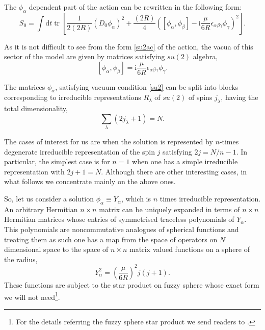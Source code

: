\documentclass[a4paper]{article}
\newcommand{\ii}{\mathrm{i}}
\newcommand{\dd}{\mathrm{d}}
\newcommand{\tr}{\mathop{\mathrm{tr}}\nolimits}
\begin{document}
The $\phi_\alpha$ dependent part of the action can be rewritten in
the following form:
\begin{equation}\label{su2ac}
S_0=\int\dd t\tr\left[\frac{1}{2(2R)}(D_0\phi_\alpha)^2+
\frac{(2R)}{4}\left([\phi_\alpha,\phi_\beta]-
\ii\frac{\mu}{6R}\epsilon_{\alpha\beta\gamma}\phi_\gamma\right)^2\right].
\end{equation}

As it is not difficult to see from the form \eqref{su2ac} of the
action, the vacua of this sector of the model are given by
matrices satisfying $su(2)$ algebra,
\begin{equation}\label{su2}
[\phi_\alpha,\phi_\beta]=
\ii\frac{\mu}{6R}\epsilon_{\alpha\beta\gamma}\phi_\gamma.
\end{equation}

The matrices $\phi_\alpha$, satisfying vacuum condition
\eqref{su2} can be split into blocks corresponding to irreducible
representations $R_\lambda$ of $su(2)$ of spins $j_\lambda$,
having the total dimensionality,
\begin{equation}\label{sum-rep}
\sum_\lambda (2j_\lambda+1)=N.
\end{equation}

The cases of interest for us are when the solution is represented
by $n$-times degenerate irreducible representation of the spin $j$
satisfying $2j=N/n-1$. In particular, the simplest case is for
$n=1$ when one has a simple irreducible representation with
$2j+1=N$. Although there are other interesting cases, in what
follows we concentrate mainly on the above ones.

So, let us consider a solution $\phi_\alpha\equiv Y_\alpha$, which
is $n$ times irreducible representation. An arbitrary Hermitian
$n\times n$ matrix can be uniquely expanded in terms of $n\times
n$ Hermitian matrices whose entries of symmetrised traceless
polynomials of $Y_\alpha$. This polynomials are noncommutative
analogues of spherical functions and treating them as such one has
a map from the space of operators on $N$ dimensional space to the
space of $n\times n$ matrix valued functions on a sphere of the
radius,
\begin{equation}\label{radius}
Y_\alpha^2= \left(\frac{\mu}{6R}\right)^2j(j+1).
\end{equation}
These functions are subject to the star product on fuzzy
sphere whose exact form we will not need\footnote{For the details
referring the fuzzy sphere star product we
send readers to \cite{Valtancoli:2002rx,Dasgupta:2002hx}.}.
\end{document}
